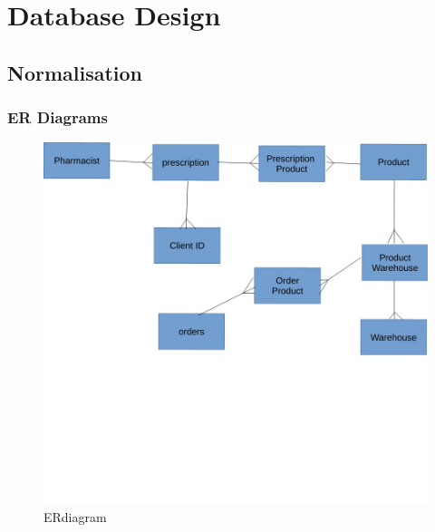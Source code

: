 \section{Database Design}

\subsection{Normalisation}

\subsubsection{ER Diagrams}
\begin{figure}[H]
\centering
\includegraphics[trim = 0mm 100mm 0mm 0mm, clip, width=140mm, scale=2]{ERdiagram.JPG}
\caption{ERdiagram \label{overflow}}
\end{figure}
